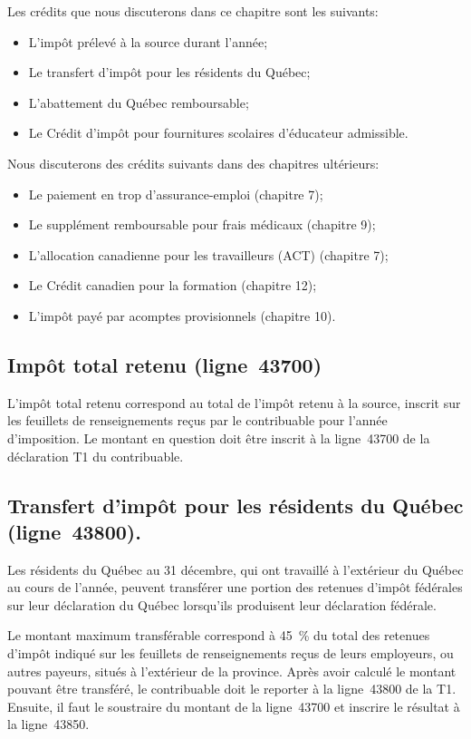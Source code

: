Les crédits que nous discuterons dans ce chapitre sont les suivants:
\begin{itemize}
	\item L'impôt prélevé à la source durant l'année;
	\item Le transfert d'impôt pour les résidents du Québec;
	\item L'abattement du Québec remboursable;
	\item Le Crédit d'impôt pour fournitures scolaires d'éducateur admissible.
\end{itemize}

Nous discuterons des crédits suivants dans des chapitres ultérieurs: 
\begin{itemize}
	\item Le paiement en trop d'assurance-emploi (chapitre 7);
	\item Le supplément remboursable pour frais médicaux (chapitre 9);
	\item L'allocation canadienne pour les travailleurs (ACT) (chapitre 7);
	\item Le Crédit canadien pour la formation (chapitre 12);
	\item L'impôt payé par acomptes provisionnels (chapitre 10).
\end{itemize}


\subsection{Impôt total retenu (ligne~43700)}
L'impôt total retenu correspond au total de l'impôt retenu à la source, inscrit sur les feuillets de renseignements reçus par le contribuable pour l'année d'imposition. Le montant en question doit être inscrit à la ligne~43700 de la déclaration T1 du contribuable.


\subsection{Transfert d'impôt pour les résidents du Québec (ligne~43800).}
Les résidents du Québec au 31 décembre, qui ont travaillé à l'extérieur du Québec au cours de l'année, peuvent transférer une portion des retenues d'impôt fédérales sur leur déclaration du Québec lorsqu'ils produisent leur déclaration fédérale.

Le montant maximum transférable correspond à 45~\% du total des retenues d'impôt indiqué sur les feuillets de renseignements reçus de leurs employeurs, ou autres payeurs, situés à l'extérieur de la province. Après avoir calculé le montant pouvant être transféré, le contribuable doit le reporter à la ligne~43800 de la T1. Ensuite, il faut le soustraire du montant de la ligne~43700 et inscrire le résultat à la ligne~43850.

